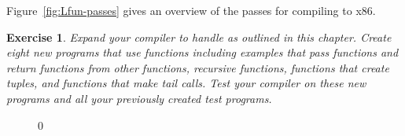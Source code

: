 \documentclass[7x10]{TimesAPriori_MIT}%
\def\racketEd{0}
\def\edition{1}
\newtheorem{exercise}[theorem]{Exercise}
\numberwithin{theorem}{chapter}
\numberwithin{definition}{chapter}
\numberwithin{equation}{chapter}
\begin{document}
Figure~\ref{fig:Lfun-passes} gives an overview of the passes for
compiling \LangFun{} to x86.

\begin{exercise}\normalfont\normalsize
Expand your compiler to handle \LangFun{} as outlined in this chapter.
Create eight new programs that use functions including examples that
pass functions and return functions from other functions, recursive
functions, functions that create tuples, and functions that make tail
calls. Test your compiler on these new programs and all your
previously created test programs.
\end{exercise}


\begin{figure}[tbp]
  \begin{tcolorbox}[colback=white]
{\if\edition\racketEd    
    }
\end{tcolorbox}
\end{figure}
\end{document}
